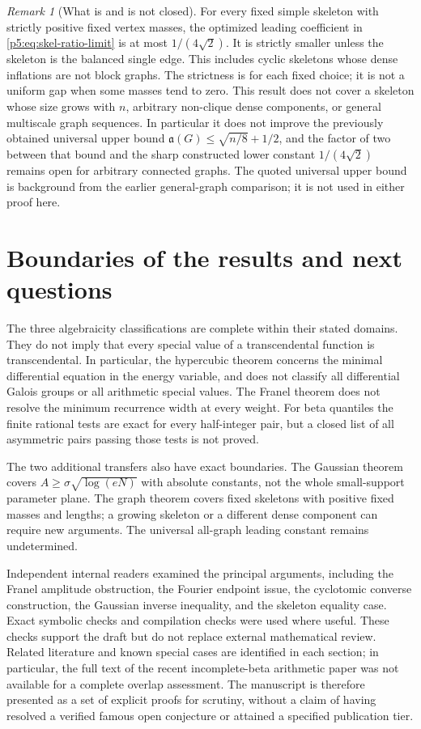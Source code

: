 \documentclass[11pt,a4paper]{article}
\theoremstyle{definition}
\theoremstyle{remark}
\newtheorem{remark}[theorem]{Remark}
\numberwithin{equation}{section}
\begin{document}
\begin{remark}[What is and is not closed]\label{p5:rem:skel-scope}
For every fixed simple skeleton with strictly positive fixed
vertex masses, the optimized leading coefficient in
\eqref{p5:eq:skel-ratio-limit} is at most $1/(4\sqrt2)$.
It is strictly smaller unless the skeleton is the balanced
single edge.  This includes cyclic skeletons whose dense
inflations are not block graphs.  The strictness is for each
fixed choice; it is not a uniform gap when some masses tend
to zero.  This result does not cover a skeleton whose size
grows with $n$, arbitrary non-clique dense components, or
general multiscale graph sequences.  In particular it does
not improve the previously obtained universal upper bound
$\mathfrak a(G)\leq\sqrt{n/8}+1/2$, and the factor of two
between that bound and the sharp constructed lower constant
$1/(4\sqrt2)$ remains open for arbitrary connected graphs.
The quoted universal upper bound is background from the earlier
general-graph comparison; it is not used in either proof here.
\end{remark}



\section{Boundaries of the results and next questions}

The three algebraicity classifications are complete within their stated
domains. They do not imply that every special value of a transcendental
function is transcendental. In particular, the hypercubic theorem concerns
the minimal differential equation in the energy variable, and does not
classify all differential Galois groups or all arithmetic special values.
The Franel theorem does not resolve the minimum recurrence width at every
weight. For beta quantiles the finite rational tests are exact for every
half-integer pair, but a closed list of all asymmetric pairs passing
those tests is not proved.

The two additional transfers also have exact boundaries. The Gaussian
theorem covers $A\ge\sigma\sqrt{\log(eN)}$ with absolute constants,
not the whole small-support parameter plane. The graph theorem covers
fixed skeletons with positive fixed masses and lengths; a growing
skeleton or a different dense component can require new arguments.
The universal all-graph leading constant remains undetermined.

Independent internal readers examined the principal arguments, including
the Franel amplitude obstruction, the Fourier endpoint issue, the
cyclotomic converse construction, the Gaussian inverse inequality, and
the skeleton equality case. Exact symbolic checks and compilation checks
were used where useful. These checks support the draft but do not replace
external mathematical review. Related literature and known special
cases are identified in each section; in particular, the full text of
the recent incomplete-beta arithmetic paper was not available for a
complete overlap assessment. The manuscript is therefore presented as
a set of explicit proofs for scrutiny, without a claim of having resolved
a verified famous open conjecture or attained a specified publication tier.
\end{document}
